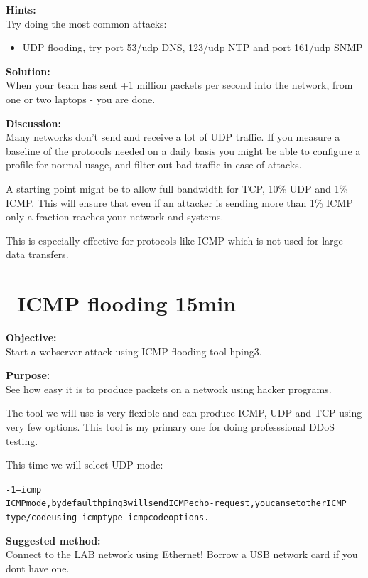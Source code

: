 \documentclass[a4paper,11pt,notitlepage]{report}
\begin{document}
{\bf Hints:}\\

Try doing the most common attacks:
\begin{itemize}
\item UDP flooding, try port 53/udp DNS, 123/udp NTP and port 161/udp SNMP
\end{itemize}

{\bf Solution:}\\
When your team has sent +1 million packets per second into the network, from one or two laptops - you are done.

{\bf Discussion:}\\
Many networks don't send and receive a lot of UDP traffic. If you measure a baseline of the protocols needed on a daily basis you might be able to configure a profile for normal usage, and filter out bad traffic in case of attacks.

A starting point might be to allow full bandwidth for TCP, 10\% UDP and 1\% ICMP. This will ensure that even if an attacker is sending more than 1\% ICMP only a fraction reaches your network and systems.

This is especially effective for protocols like ICMP which is not used for large data transfers.

\chapter{\faInfoCircle\ ICMP flooding 15min}

{\bf Objective:}\\
Start a webserver attack using ICMP flooding tool hping3.

{\bf Purpose:}\\
See how easy it is to produce packets on a network using hacker programs.

The tool we will use is very flexible and can produce ICMP, UDP and TCP using very few options. This tool is my primary one for doing professsional DDoS testing.

This time we will select UDP mode:

\begin{alltt}\footnotesize
-1 --icmp
       ICMP  mode,  by  default  hping3  will  send  ICMP echo-request, you can set other ICMP
       type/code using --icmptype --icmpcode options.
\end{alltt}

{\bf Suggested method:}\\
Connect to the LAB network using Ethernet! Borrow a USB network card if you dont have one.
\end{document}
